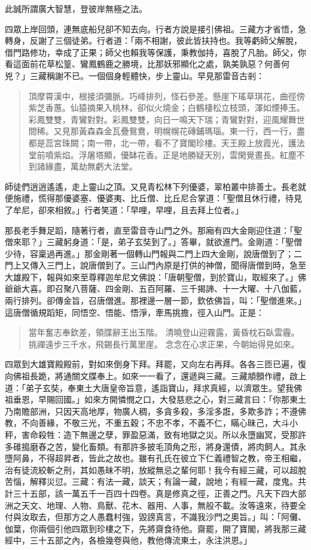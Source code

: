 此誠所謂廣大智慧，登彼岸無極之法。

四眾上岸回頭，連無底船兒卻不知去向。行者方說是接引佛祖。三藏方才省悟，急轉身，反謝了三個徒弟。行者道：「兩不相謝，彼此皆扶持也。我等虧師父解脫，借門路修功，幸成了正果；師父也賴我等保護，秉教伽持，喜脫了凡胎。師父，你看這面前花草松篁、鸞鳳鶴鹿之勝境，比那妖邪顯化之處，孰美孰惡？何善何兇？」三藏稱謝不已。一個個身輕體快，步上靈山。早見那雷音古剎：
\begin{quote}
頂摩霄漢中，根接須彌脈。巧峰排列，怪石參差。懸崖下瑤草琪花，曲徑傍紫芝香蕙。仙猿摘果入桃林，卻似火燒金；白鶴棲松立枝頭，渾如煙捧玉。彩鳳雙雙，青鸞對對。彩鳳雙雙，向日一鳴天下瑞；青鸞對對，迎風耀舞世間稀。又見那黃森森金瓦疊鴛鴦，明幌幌花磚鋪瑪瑙。東一行，西一行，盡都是蕊宮珠闕；南一帶，北一帶，看不了寶閣珍樓。天王殿上放霞光，護法堂前噴紫焰。浮屠塔顯，優缽花香。正是地勝疑天別，雲閑覺晝長。紅塵不到諸緣盡，萬劫無虧大法堂。
\end{quote}

師徒們逍逍遙遙，走上靈山之頂。又見青松林下列優婆，翠柏叢中排善士。長老就便施禮，慌得那優婆塞、優婆夷、比丘僧、比丘尼合掌道：「聖僧且休行禮，待見了牟尼，卻來相敘。」行者笑道：「早哩，早哩，且去拜上位者。」

那長老手舞足蹈，隨著行者，直至雷音寺山門之外。那廂有四大金剛迎住道：「聖僧來耶？」三藏躬身道：「是，弟子玄奘到了。」答畢，就欲進門。金剛道：「聖僧少待，容稟過再進。」那金剛著一個轉山門報與二門上四大金剛，說唐僧到了；二門上又傳入三門上，說唐僧到了。三山門內原是打供的神僧，聞得唐僧到時，急至大雄殿下，報與如來至尊釋迦牟尼文佛說：「唐朝聖僧，到於寶山，取經來了。」佛爺爺大喜。即召聚八菩薩、四金剛、五百阿羅、三千揭諦、十一大曜、十八伽藍，兩行排列。卻傳金旨，召唐僧進。那裡邊一層一節，欽依佛旨，叫：「聖僧進來。」這唐僧循規蹈矩，同悟空、悟能、悟淨，牽馬挑擔，徑入山門。正是：
\begin{quote}
當年奮志奉欽差，領牒辭王出玉階。
清曉登山迎霧露，黃昏枕石臥雲霾。
挑禪遠步三千水，飛錫長行萬里崖。
念念在心求正果，今朝始得見如來。
\end{quote}

四眾到大雄寶殿殿前，對如來倒身下拜。拜罷，又向左右再拜。各各三匝已遍，復向佛祖長跪，將通關文牒奉上。如來一一看了，還遞與三藏。三藏頫顖作禮，啟上道：「弟子玄奘，奉東土大唐皇帝旨意，遙詣寶山，拜求真經，以濟眾生。望我佛祖垂恩，早賜回國。」如來方開憐憫之口，大發慈悲之心，對三藏言曰：「你那東土乃南贍部洲，只因天高地厚，物廣人稠，多貪多殺，多淫多誑，多欺多詐；不遵佛教，不向善緣，不敬三光，不重五穀；不忠不孝，不義不仁，瞞心昧己，大斗小秤，害命殺牲：造下無邊之孽，罪盈惡滿，致有地獄之災。所以永墮幽冥，受那許多碓搗磨舂之苦，變化畜類。有那許多披毛頂角之形，將身還債，將肉飼人。其永墮阿鼻，不得超昇者，皆此之故也。雖有孔氏在彼立下仁義禮智之教，帝王相繼，治有徒流絞斬之刑，其如愚昧不明，放縱無忌之輩何耶！我今有經三藏，可以超脫苦惱，解釋災愆。三藏：有法一藏，談天；有論一藏，說地；有經一藏，度鬼。共計三十五部，該一萬五千一百四十四卷。真是修真之徑，正善之門。凡天下四大部洲之天文、地理、人物、鳥獸、花木、器用、人事，無般不載。汝等遠來，待要全付與汝取去，但那方之人愚蠢村強，毀謗真言，不識我沙門之奧旨。」叫：「阿儺、伽葉，你兩個引他四眾到珍樓之下，先將齋食待他。齋罷，開了寶閣，將我那三藏經中，三十五部之內，各檢幾卷與他，教他傳流東土，永注洪恩。」

